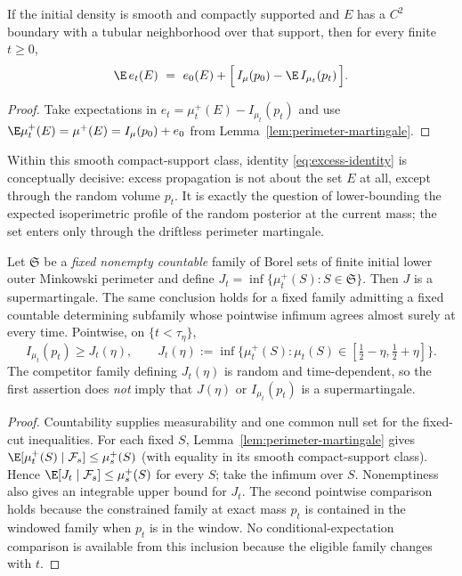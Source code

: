 \documentclass[../../main.tex]{subfiles}
\begin{document}
\begin{lemma}
\label{lem:excess-identity}
If the initial density is smooth and compactly supported and $E$ has a $C^2$ boundary with a
tubular neighborhood over that support, then for every finite $t\ge0$,
\begin{equation}\label{eq:excess-identity}
  \E\,e_t(E)\ =\ e_0(E)+\Bigl[\,I_\mu(p_0)-\E\,I_{\mu_t}(p_t)\,\Bigr].
\end{equation}
\end{lemma}

\begin{proof}
Take expectations in $e_t=\mu_t^+(E)-I_{\mu_t}(p_t)$ and use
$\E\mu_t^+(E)=\mu^+(E)=I_\mu(p_0)+e_0$ from Lemma~\ref{lem:perimeter-martingale}.
\end{proof}

Within this smooth compact-support class, identity \eqref{eq:excess-identity} is conceptually
decisive: excess propagation is not about the set $E$ at all, except through the random volume
$p_t$. It is exactly the question of
lower-bounding the expected isoperimetric profile of the random posterior at the current mass;
the set enters only through the driftless perimeter martingale.

\begin{lemma}
\label{lem:inf-martingales}
Let $\mathfrak S$ be a \emph{fixed nonempty countable} family of Borel sets of finite initial
lower outer Minkowski perimeter and define
$J_t=\inf\{\mu_t^+(S):S\in\mathfrak S\}$. Then $J$ is a supermartingale. The same conclusion
holds for a fixed family admitting a fixed countable determining subfamily whose pointwise
infimum agrees almost surely at every time. Pointwise, on
$\{t<\tau_\eta\}$,
\[
  I_{\mu_t}(p_t)\ge J_t(\eta),
  \qquad
  J_t(\eta):=\inf\bigl\{\mu_t^+(S):
    \mu_t(S)\in[\tfrac12-\eta,\tfrac12+\eta]\bigr\}.
\]
The competitor family defining $J_t(\eta)$ is random and time-dependent, so the first assertion
does \emph{not} imply that $J(\eta)$ or $I_{\mu_t}(p_t)$ is a supermartingale.
\end{lemma}

\begin{proof}
Countability supplies measurability and one common null set for the fixed-cut inequalities. For
each fixed $S$, Lemma~\ref{lem:perimeter-martingale} gives
$\E[\mu_t^+(S)\mid\mathcal F_s]\le\mu_s^+(S)$ (with equality in its smooth compact-support
class). Hence
$\E[J_t\mid\mathcal F_s]\le\mu_s^+(S)$ for every $S$; take the infimum over $S$. Nonemptiness
also gives an integrable upper bound for $J_t$. The second
pointwise comparison holds because the constrained family at exact mass $p_t$ is contained in
the windowed family when $p_t$ is in the window. No conditional-expectation comparison is
available from this inclusion because the eligible family changes with $t$.
\end{proof}
\end{document}

